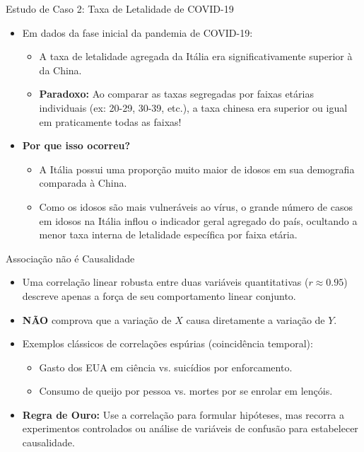 \begin{frame}{Estudo de Caso 2: Taxa de Letalidade de COVID-19}
    \begin{itemize}
        \item Em dados da fase inicial da pandemia de COVID-19:
        \begin{itemize}
            \item A taxa de letalidade agregada da Itália era significativamente superior à da China.
            \item \textbf{Paradoxo:} Ao comparar as taxas segregadas por faixas etárias individuais (ex: 20-29, 30-39, etc.), a taxa chinesa era superior ou igual em praticamente todas as faixas!
        \end{itemize}
        \item \textbf{Por que isso ocorreu?}
        \begin{itemize}
            \item A Itália possui uma proporção muito maior de idosos em sua demografia comparada à China.
            \item Como os idosos são mais vulneráveis ao vírus, o grande número de casos em idosos na Itália inflou o indicador geral agregado do país, ocultando a menor taxa interna de letalidade específica por faixa etária.
        \end{itemize}
    \end{itemize}
\end{frame}

\begin{frame}{Associação não é Causalidade}
    \begin{itemize}
        \item Uma correlação linear robusta entre duas variáveis quantitativas ($r \approx 0.95$) descreve apenas a força de seu comportamento linear conjunto.
        \item \textbf{NÃO} comprova que a variação de $X$ causa diretamente a variação de $Y$.
        \item Exemplos clássicos de correlações espúrias (coincidência temporal):
        \begin{itemize}
            \item Gasto dos EUA em ciência vs. suicídios por enforcamento.
            \item Consumo de queijo por pessoa vs. mortes por se enrolar em lençóis.
        \end{itemize}
        \item \textbf{Regra de Ouro:} Use a correlação para formular hipóteses, mas recorra a experimentos controlados ou análise de variáveis de confusão para estabelecer causalidade.
    \end{itemize}
\end{frame}
